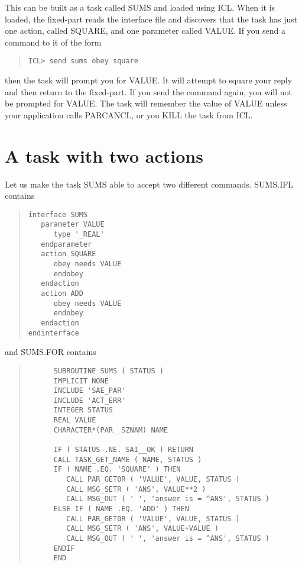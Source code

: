 \documentclass[twoside,11pt]{article}
\newcommand{\xlabel}[1]{}
\renewcommand{\_}{\texttt{\symbol{95}}}
\begin{document}
This can be built as a task called SUMS and loaded using ICL. When it is
loaded, the fixed-part reads the interface file and discovers that the
task has just one action, called SQUARE, and one parameter called VALUE.
If you send a command to it of the form

\small \begin{quote} \begin{verbatim}
ICL> send sums obey square
\end{verbatim} \end{quote} \normalsize

then the task will prompt you for VALUE. It will attempt to square your
reply and then return to the fixed-part. If you send the command again,
you will not be prompted for VALUE. The task will remember the value of
VALUE unless your application calls PAR\_CANCL, or you KILL the task
from ICL.

\section{A task with two actions\xlabel{a_task_with_two_actions}}

Let us make the task SUMS able to accept two different commands.
SUMS.IFL contains

\small \begin{quote} \begin{verbatim}
interface SUMS
   parameter VALUE
      type '_REAL'
   endparameter
   action SQUARE
      obey needs VALUE
      endobey
   endaction
   action ADD
      obey needs VALUE
      endobey
   endaction
endinterface
\end{verbatim} \end{quote} \normalsize

and SUMS.FOR contains

\small \begin{quote} \begin{verbatim}
      SUBROUTINE SUMS ( STATUS )
      IMPLICIT NONE
      INCLUDE 'SAE_PAR'
      INCLUDE 'ACT_ERR'
      INTEGER STATUS
      REAL VALUE
      CHARACTER*(PAR__SZNAM) NAME

      IF ( STATUS .NE. SAI__OK ) RETURN
      CALL TASK_GET_NAME ( NAME, STATUS )
      IF ( NAME .EQ. 'SQUARE' ) THEN
         CALL PAR_GET0R ( 'VALUE', VALUE, STATUS )
         CALL MSG_SETR ( 'ANS', VALUE**2 )
         CALL MSG_OUT ( ' ', 'answer is = ^ANS', STATUS )
      ELSE IF ( NAME .EQ. 'ADD' ) THEN
         CALL PAR_GET0R ( 'VALUE', VALUE, STATUS )
         CALL MSG_SETR ( 'ANS', VALUE+VALUE )
         CALL MSG_OUT ( ' ', 'answer is = ^ANS', STATUS )
      ENDIF
      END
\end{verbatim} \end{quote} \normalsize
\end{document}
